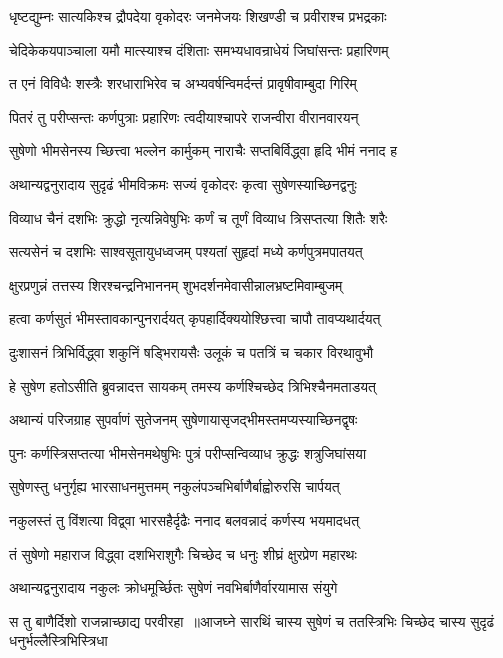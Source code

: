 \twolineshloka
{धृष्टद्युम्नः सात्यकिश्च द्रौपदेया वृकोदरः}
{जनमेजयः शिखण्डी च प्रवीराश्च प्रभद्रकाः}


\twolineshloka
{चेदिकेकयपाञ्चाला यमौ मात्स्याश्च दंशिताः}
{समभ्यधावन्राधेयं जिघांसन्तः प्रहारिणम्}


\twolineshloka
{त एनं विविधैः शस्त्रैः शरधाराभिरेव च}
{अभ्यवर्षन्विमर्दन्तं प्रावृषीवाम्बुदा गिरिम्}


\twolineshloka
{पितरं तु परीप्सन्तः कर्णपुत्राः प्रहारिणः}
{त्वदीयाश्चापरे राजन्वीरा वीरानवारयन्}


\twolineshloka
{सुषेणो भीमसेनस्य च्छित्त्वा भल्लेन कार्मुकम्}
{नाराचैः सप्तबिर्विद्ध्वा हृदि भीमं ननाद ह}


\twolineshloka
{अथान्यद्वनुरादाय सुदृढं भीमविक्रमः}
{सज्यं वृकोदरः कृत्वा सुषेणस्याच्छिनद्वनुः}


\twolineshloka
{विव्याध चैनं दशभिः क्रुद्धो नृत्यन्निवेषुभिः}
{कर्णं च तूर्णं विव्याध त्रिसप्तत्या शितैः शरैः}


\twolineshloka
{सत्यसेनं च दशभिः साश्वसूतायुधध्वजम्}
{पश्यतां सुहृदां मध्ये कर्णपुत्रमपातयत्}


\twolineshloka
{क्षुरप्रणुन्नं तत्तस्य शिरश्चन्द्रनिभाननम्}
{शुभदर्शनमेवासीन्नालभ्रष्टमिवाम्बुजम्}


\twolineshloka
{हत्वा कर्णसुतं भीमस्तावकान्पुनरार्दयत्}
{कृपहार्दिक्ययोश्छित्त्वा चापौ तावप्यथार्दयत्}


\twolineshloka
{दुःशासनं त्रिभिर्विद्ध्वा शकुनिं षड्भिरायसैः}
{उलूकं च पतत्रिं च चकार विरथावुभौ}


\twolineshloka
{हे सुषेण हतोऽसीति ब्रुवन्नादत्त सायकम्}
{तमस्य कर्णश्चिच्छेद त्रिभिश्चैनमताडयत्}


\twolineshloka
{अथान्यं परिजग्राह सुपर्वाणं सुतेजनम्}
{सुषेणायासृजद्भीमस्तमप्यस्याच्छिनद्वृषः}


\twolineshloka
{पुनः कर्णस्त्रिसप्तत्या भीमसेनमथेषुभिः}
{पुत्रं परीप्सन्विव्याध क्रुद्धः शत्रुजिघांसया}


\twolineshloka
{सुषेणस्तु धनुर्गृह्य भारसाधनमुत्तमम्}
{नकुलंपञ्चभिर्बाणैर्बाह्वोरुरसि चार्पयत्}


\twolineshloka
{नकुलस्तं तु विंशत्या विद्व्वा भारसहैर्दृढैः}
{ननाद बलवन्नादं कर्णस्य भयमादधत्}


\twolineshloka
{तं सुषेणो महाराज विद्ध्वा दशभिराशुगैः}
{चिच्छेद च धनुः शीघ्रं क्षुरप्रेण महारथः}


\twolineshloka
{अथान्यद्वनुरादाय नकुलः क्रोधमूर्च्छितः}
{सुषेणं नवभिर्बाणैर्वारयामास संयुगे}


\twolineshloka
{स तु बाणैर्दिशो राजन्नाच्छाद्य परवीरहा ॥आजघ्ने सारथिं चास्य सुषेणं च ततस्त्रिभिः}
{चिच्छेद चास्य सुदृढं धनुर्भल्लैस्त्रिभिस्त्रिधा}


